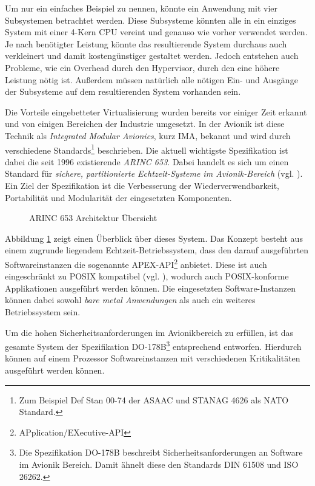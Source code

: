 \documentclass[
  a4paper,					    %
  twoside,
  DIV=calc,     				%
  bibliography=totoc,
  cleardoublepage=empty,
  ngerman,     					%
  final       					%
]{scrbook}
\begin{document}
Um nur ein einfaches Beispiel zu nennen, könnte ein Anwendung mit vier Subsystemen betrachtet werden. Diese Subsysteme könnten alle in ein einziges System mit einer 4-Kern CPU vereint und genauso wie vorher verwendet werden. Je nach benötigter Leistung könnte das resultierende System durchaus auch verkleinert und damit kostengünstiger gestaltet werden. Jedoch entstehen auch Probleme, wie ein Overhead durch den Hypervisor, durch den eine höhere Leistung nötig ist. Außerdem müssen natürlich alle nötigen Ein- und Ausgänge der Subsysteme auf dem resultierenden System vorhanden sein.

Die Vorteile eingebetteter Virtualisierung wurden bereits vor einiger Zeit erkannt und von einigen Bereichen der Industrie umgesetzt. In der Avionik ist diese Technik als \emph{Integrated Modular Avionics}, kurz IMA, bekannt und wird durch verschiedene Standards\footnote{Zum Beispiel Def Stan 00-74 der ASAAC und STANAG 4626 als NATO Standard.} beschrieben. Die aktuell wichtigste Spezifikation ist dabei die seit 1996 existierende \emph{ARINC 653}. Dabei handelt es sich um einen Standard für \emph{sichere, partitionierte Echtzeit-Systeme im Avionik-Bereich} (vgl. \cite{arinc653_wr}). Ein Ziel der Spezifikation ist die Verbesserung der Wiederverwendbarkeit, Portabilität und Modularität der eingesetzten Komponenten.

\begin{figure}[ht]
    \centering
    
    \caption[ARINC 653 Architektur Übersicht]{ARINC 653 Architektur Übersicht\cite{arinc653_wr}}
    \label{fig:arinc_653}
\end{figure}

Abbildung \ref{fig:arinc_653} zeigt einen Überblick über dieses System. Das Konzept besteht aus einem zugrunde liegendem Echtzeit-Betriebssystem, dass den darauf ausgeführten Softwareinstanzen die sogenannte APEX-API\footnote{APplication/EXecutive-API} anbietet. Diese ist auch eingeschränkt zu POSIX kompatibel (vgl. \cite{wiki:arinc_653}), wodurch auch POSIX-konforme Applikationen ausgeführt werden können. Die eingesetzten Software-Instanzen können dabei sowohl \emph{bare metal Anwendungen} als auch ein weiteres Betriebssystem sein.

Um die hohen Sicherheitsanforderungen im Avionikbereich zu erfüllen, ist das gesamte System der Spezifikation DO-178B\footnote{Die Spezifikation DO-178B beschreibt Sicherheitsanforderungen an Software im Avionik Bereich. Damit ähnelt diese den Standards DIN 61508 und ISO 26262.} entsprechend entworfen. Hierdurch können auf einem Prozessor Softwareinstanzen mit verschiedenen Kritikalitäten ausgeführt werden können. 
\end{document}
